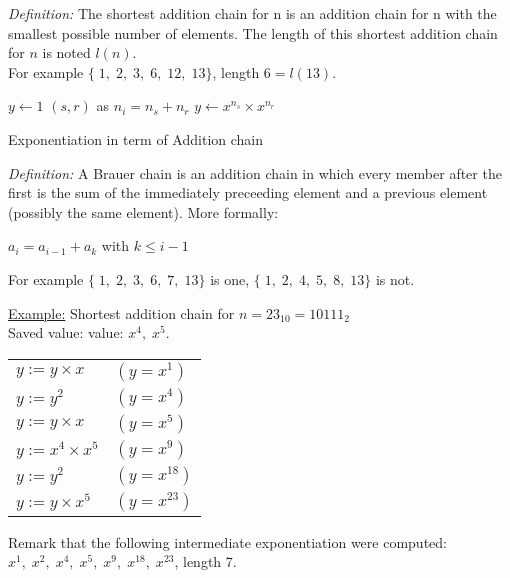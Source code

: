 \textit{Definition:}
	The shortest addition chain for n is an addition chain for n 
	with the smallest possible number of elements.
	The length of this shortest addition chain for $n$ is noted $l(n)$. \\ 
	For example $\{\;1,\; 2,\; 3,\; 6,\; 12,\; 13\}$, length $6=l(13)$.
\begin{algorithm}[h]
	 $y \leftarrow 1$ \;
	{
	$(s,r)$ as $n_i = n_s + n_r$
	$y \leftarrow x^{n_s} \times x^{n_r} $				
	}									 
	\;
	\caption{Exponentiation in term of Addition chain}
\end{algorithm}
		
\textit{Definition:}
		A Brauer chain is an addition chain in which every member after the 
		first is the sum of the immediately preceeding element and a 
		previous element (possibly the same element). More formally: 		 
		\begin{center}
		$a_i  = a_{i-1}+a_k$ with $k \leq i-1 $
		\end{center}	
		For example $\{\;1,\; 2,\; 3,\; 6,\; 7,\; 13\}$ is one,
		$\{\;1,\; 2,\; 4,\; 5,\; 8,\; 13\}$ is not.
			 
\underline{Example:} Shortest addition chain for $n=23_{10}=10111_2$ \\ 
		Saved value: value: $x^{4},\;x^{5}$.\\			
		\begin{tabularx}{\linewidth}{ p{16cm} p{2cm} }
			$y:=y \times x$ 		& $(y=x^{1})$\\
			$y:=y^2$ 				& $(y=x^{4})$\\
			$y:=y \times x$ 		& $(y=x^{5})$\\
			$y:=x^{4} \times x^{5}$ & $(y=x^{9})$\\
			$y:=y^2$ 				& $(y=x^{18})$\\
			$y:=y \times x^{5}$     & $(y=x^{23})$				
		\end{tabularx}
		Remark that the following intermediate exponentiation were computed:			
		$ x^{1},\; x^{2},\; x^{4},\; x^{5},\; x^{9},\; x^{18},\; x^{23} $,
		length 7. 
		\vspace{3mm}
			
